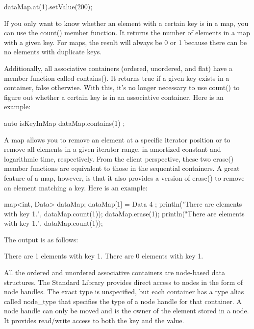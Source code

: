 \begin{cpp}
dataMap.at(1).setValue(200);
\end{cpp}

If you only want to know whether an element with a certain key is in a map, you can use the count() member function. It returns the number of elements in a map with a given key. For maps, the result will always be 0 or 1 because there can be no elements with duplicate keys.

Additionally, all associative containers (ordered, unordered, and flat) have a member function called contains(). It returns true if a given key exists in a container, false otherwise. With this, it’s no longer necessary to use count() to figure out whether a certain key is in an associative container. Here is an example:

\begin{cpp}
auto isKeyInMap { dataMap.contains(1) };
\end{cpp}


A map allows you to remove an element at a specific iterator position or to remove all elements in a given iterator range, in amortized constant and logarithmic time, respectively. From the client perspective, these two erase() member functions are equivalent to those in the sequential containers. A great feature of a map, however, is that it also provides a version of erase() to remove an element matching a key. Here is an example:

\begin{cpp}
map<int, Data> dataMap;
dataMap[1] = Data { 4 };
println("There are {} elements with key 1.", dataMap.count(1));
dataMap.erase(1);
println("There are {} elements with key 1.", dataMap.count(1));
\end{cpp}

The output is as follows:

\begin{shell}
There are 1 elements with key 1.
There are 0 elements with key 1.
\end{shell}


All the ordered and unordered associative containers are node-based data structures. The Standard Library provides direct access to nodes in the form of node handles. The exact type is unspecified, but each container has a type alias called node\_type that specifies the type of a node handle for that container. A node handle can only be moved and is the owner of the element stored in a node. It provides read/write access to both the key and the value.

